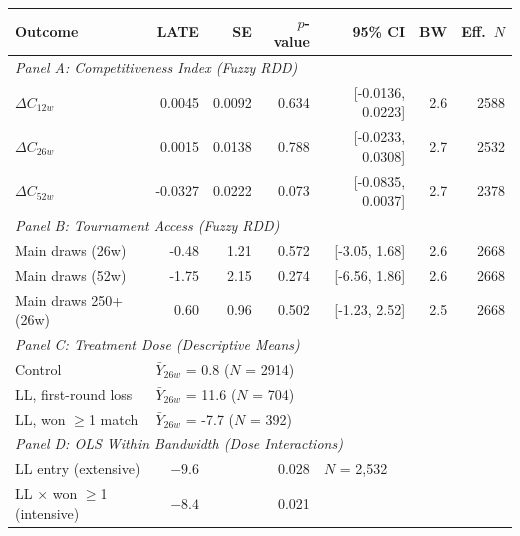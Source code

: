 \begin{tabular}{lrrrrrr}
\toprule
Outcome & LATE & SE & $p$-value & 95\% CI & BW & Eff.\ $N$ \\
\midrule
\multicolumn{7}{l}{\textit{Panel A: Competitiveness Index (Fuzzy RDD)}} \\
$\Delta C_{12w}$ & 0.0045 & 0.0092 & 0.634 & [-0.0136, 0.0223] & 2.6 & 2588 \\
$\Delta C_{26w}$ & 0.0015 & 0.0138 & 0.788 & [-0.0233, 0.0308] & 2.7 & 2532 \\
$\Delta C_{52w}$ & -0.0327 & 0.0222 & 0.073 & [-0.0835, 0.0037] & 2.7 & 2378 \\
\midrule
\multicolumn{7}{l}{\textit{Panel B: Tournament Access (Fuzzy RDD)}} \\
Main draws (26w) & -0.48 & 1.21 & 0.572 & [-3.05, 1.68] & 2.6 & 2668 \\
Main draws (52w) & -1.75 & 2.15 & 0.274 & [-6.56, 1.86] & 2.6 & 2668 \\
Main draws 250+ (26w) & 0.60 & 0.96 & 0.502 & [-1.23, 2.52] & 2.5 & 2668 \\
\midrule
\multicolumn{7}{l}{\textit{Panel C: Treatment Dose (Descriptive Means)}} \\
Control & \multicolumn{6}{l}{$\bar{Y}_{26w}$ = 0.8 ($N$ = 2914)} \\
LL, first-round loss & \multicolumn{6}{l}{$\bar{Y}_{26w}$ = 11.6 ($N$ = 704)} \\
LL, won $\geq$1 match & \multicolumn{6}{l}{$\bar{Y}_{26w}$ = -7.7 ($N$ = 392)} \\
\midrule
\multicolumn{7}{l}{\textit{Panel D: OLS Within Bandwidth (Dose Interactions)}} \\
LL entry (extensive) & $-9.6$ & & 0.028 & \multicolumn{3}{l}{$N$ = 2,532} \\
LL $\times$ won $\geq$1 (intensive) & $-8.4$ & & 0.021 & & & \\
\bottomrule
\end{tabular}
